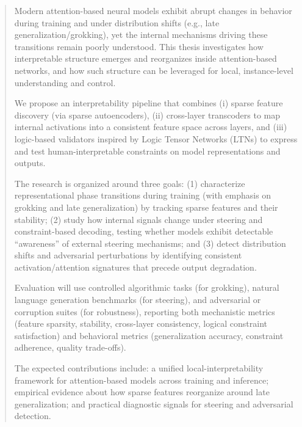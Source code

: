 \documentclass[../infufrgs/ppgc-tese.tex]{subfiles}
\begin{document}
\begin{abstract}
Modern attention-based neural models exhibit abrupt changes in behavior during training  and under distribution shifts (e.g., late generalization/grokking), yet the internal mechanisms driving these transitions remain poorly understood. This thesis investigates how interpretable structure emerges and reorganizes inside attention-based networks, and how such structure can be leveraged for local, instance-level understanding and control.

We propose an interpretability pipeline that combines (i) sparse feature discovery (via sparse autoencoders), (ii) cross-layer transcoders to map internal activations into a consistent feature space across layers, and (iii) logic-based validators inspired by Logic Tensor Networks (LTNs) to express and test human-interpretable constraints on model representations and outputs.

The research is organized around three goals: (1) characterize representational phase transitions during training (with emphasis on grokking and late generalization) by tracking sparse features and their stability; (2) study how internal signals change under steering and constraint-based decoding, testing whether models exhibit detectable “awareness” of external steering mechanisms; and (3) detect distribution shifts and adversarial perturbations by identifying consistent activation/attention signatures that precede output degradation.

Evaluation will use controlled algorithmic tasks (for grokking), natural language generation benchmarks (for steering), and adversarial or corruption suites (for robustness), reporting both mechanistic metrics (feature sparsity, stability, cross-layer consistency, logical constraint satisfaction) and behavioral metrics (generalization accuracy, constraint adherence, quality trade-offs).

The expected contributions include: a unified local-interpretability framework for attention-based models across training and inference; empirical evidence about how sparse features reorganize around late generalization; and practical diagnostic signals for steering and adversarial detection.
\end{abstract}
\end{document}
